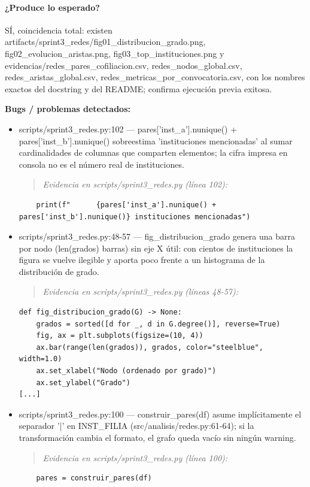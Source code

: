 \paragraph{¿Produce lo esperado?}
SÍ, coincidencia total: existen artifacts/sprint3\_redes/fig01\_distribucion\_grado.png, fig02\_evolucion\_aristas.png, fig03\_top\_instituciones.png y evidencias/redes\_pares\_cofiliacion.csv, redes\_nodos\_global.csv, redes\_aristas\_global.csv, redes\_metricas\_por\_convocatoria.csv, con los nombres exactos del docstring y del README; confirma ejecución previa exitosa.

\begin{tcolorbox}[riesgo]
\textbf{Bugs / problemas detectados:}
\begin{itemize}
  \item scripts/sprint3\_redes.py:102 --- pares['inst\_a'].nunique() + pares['inst\_b'].nunique() sobreestima 'instituciones mencionadas' al sumar cardinalidades de columnas que comparten elementos; la cifra impresa en consola no es el número real de instituciones.
\begin{quote}\footnotesize\ttfamily
\noindent\emph{Evidencia en scripts/sprint3\_redes.py (línea 102):}
\end{quote}
\begin{lstlisting}
    print(f"      {pares['inst_a'].nunique() + pares['inst_b'].nunique()} instituciones mencionadas")
\end{lstlisting}

  \item scripts/sprint3\_redes.py:48-57 --- fig\_distribucion\_grado genera una barra por nodo (len(grados) barras) sin eje X útil: con cientos de instituciones la figura se vuelve ilegible y aporta poco frente a un histograma de la distribución de grado.
\begin{quote}\footnotesize\ttfamily
\noindent\emph{Evidencia en scripts/sprint3\_redes.py (líneas 48-57):}
\end{quote}
\begin{lstlisting}
def fig_distribucion_grado(G) -> None:
    grados = sorted([d for _, d in G.degree()], reverse=True)
    fig, ax = plt.subplots(figsize=(10, 4))
    ax.bar(range(len(grados)), grados, color="steelblue", width=1.0)
    ax.set_xlabel("Nodo (ordenado por grado)")
    ax.set_ylabel("Grado")
[...]
\end{lstlisting}

  \item scripts/sprint3\_redes.py:100 --- construir\_pares(df) asume implícitamente el separador '|' en INST\_FILIA (src/analisis/redes.py:61-64); si la transformación cambia el formato, el grafo queda vacío sin ningún warning.
\begin{quote}\footnotesize\ttfamily
\noindent\emph{Evidencia en scripts/sprint3\_redes.py (línea 100):}
\end{quote}
\begin{lstlisting}
    pares = construir_pares(df)
\end{lstlisting}


\end{itemize}
\end{tcolorbox}
